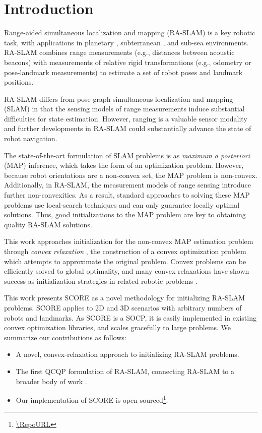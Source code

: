 \section{Introduction}

Range-aided simultaneous localization and mapping (RA-SLAM) is a key robotic
task, with applications in planetary \cite{boroson20iros}, subterranean
\cite{funabiki21ral}, and sub-sea \cite{Newman03icra,Bahr06iser,Bahr12iros}
environments. RA-SLAM combines range measurements (e.g., distances between
acoustic beacons) with measurements of relative rigid transformations (e.g.,
odometry or pose-landmark measurements) to estimate a set of robot poses and landmark positions.

RA-SLAM differs from pose-graph simultaneous localization and mapping (SLAM) in
that the sensing models of range measurements induce substantial difficulties
for state estimation. However, ranging is a valuable sensor modality and
further developments in RA-SLAM could substantially advance the state of robot
navigation.

The state-of-the-art formulation of SLAM problems is as \textit{maximum a
posteriori} (MAP) inference, which takes the form of an optimization problem.
However, because robot orientations are a non-convex set, the MAP problem is
non-convex. Additionally, in RA-SLAM, the measurement models of range sensing
introduce further non-convexities. As a result, standard approaches to solving
these MAP problems use local-search techniques and can only guarantee locally
optimal solutions. Thus, good initializations to the MAP problem are key to
obtaining quality RA-SLAM solutions.

\TitleFigure

This work approaches initialization for the non-convex MAP estimation problem
through \textit{convex relaxation} \cite{boyd04book}, the construction of a
convex optimization problem which attempts to approximate the original problem.
Convex problems can be efficiently solved to global optimality, and many convex
relaxations have shown success as initialization strategies in related robotic
problems
\cite{carlone15aicra,carlone15iros,giamou19ral,so07mathematicalprogramming}.

This work presents SCORE as a novel methodology for initializing RA-SLAM
problems. SCORE applies to 2D and 3D scenarios with arbitrary numbers of robots
and landmarks. As SCORE is a SOCP, it is easily implemented in existing
convex optimization libraries, and scales gracefully to large problems. We
summarize our contributions as follows:

\begin{itemize}
      \item A novel, convex-relaxation approach to initializing RA-SLAM
            problems.
      \item The first QCQP formulation of RA-SLAM, connecting
            RA-SLAM to a broader body of work
            \cite{rosen19ijrr,carlone15iros,giamou19ral,so07mathematicalprogramming}.
      \item Our implementation of SCORE is open-sourced\footnote{\url{\RepoURL}}.
\end{itemize}

